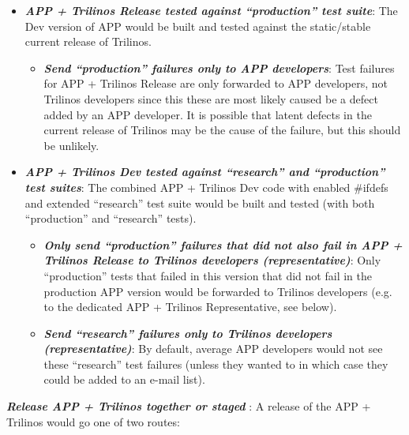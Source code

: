 \documentclass[pdf,ps2pdf,11pt]{SANDreport}
\begin{document}
  \begin{itemize}

  {}\item\textit{\textbf{APP + Trilinos Release tested against ``production''
  test suite}}: The Dev version of APP would be built and tested against the
  static/stable current release of Trilinos.

    \begin{itemize}

    {}\item\textit{\textbf{Send ``production'' failures only to APP
    developers}}: Test failures for APP + Trilinos Release are only forwarded
    to APP developers, not Trilinos developers since this these are most
    likely caused be a defect added by an APP developer.  It is possible that
    latent defects in the current release of Trilinos may be the cause of the
    failure, but this should be unlikely.

    \end{itemize}

  {}\item\textit{\textbf{APP + Trilinos Dev tested against ``research'' and
  ``production'' test suites}}: The combined APP + Trilinos Dev code with
  enabled {}\#ifdefs and extended ``research'' test suite would be built and
  tested (with both ``production'' and ``research'' tests).

    \begin{itemize}

    {}\item\textit{\textbf{Only send ``production'' failures that did not also
    fail in APP + Trilinos Release to Trilinos developers (representative)}}:
    Only ``production'' tests that failed in this version that did not fail in
    the production APP version would be forwarded to Trilinos developers
    (e.g. to the dedicated APP + Trilinos Representative, see below).

    {}\item\textit{\textbf{Send ``research'' failures only to Trilinos
    developers (representative)}}: By default, average APP developers would
    not see these ``research'' test failures (unless they wanted to in which
    case they could be added to an e-mail list).

    \end{itemize}
                
  \end{itemize}

{}\textit{\textbf{Release APP + Trilinos together or staged }}: A release of
the APP + Trilinos would go one of two routes:
\end{document}
